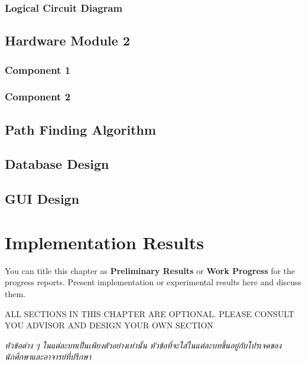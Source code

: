 \documentclass[12pt,oneside,openright,a4paper]{cpe-english-project}
\begin{document}
\subsection{Logical Circuit Diagram}

\section{Hardware Module 2}
\subsection{Component 1}
\subsection{Component 2}

\section{Path Finding Algorithm}

\section{Database Design}

\section{GUI Design}



\chapter{Implementation Results}

You can title this chapter as \textbf{Preliminary Results} or \textbf{Work Progress} for the progress reports. Present implementation or experimental results here and discuss them.


ALL SECTIONS IN THIS CHAPTER ARE OPTIONAL. PLEASE CONSULT YOU ADVISOR AND DESIGN YOUR OWN SECTION

\emph{\textthai{หัวข้อต่าง ๆ ในแต่ละบทเป็นเพียงตัวอย่างเท่านั้น หัวข้อที่จะใส่ในแต่ละบทขึ้นอยู่กับโปรเจคของนักศึกษาและอาจารย์ที่ปรึกษา}}

\end{document}
